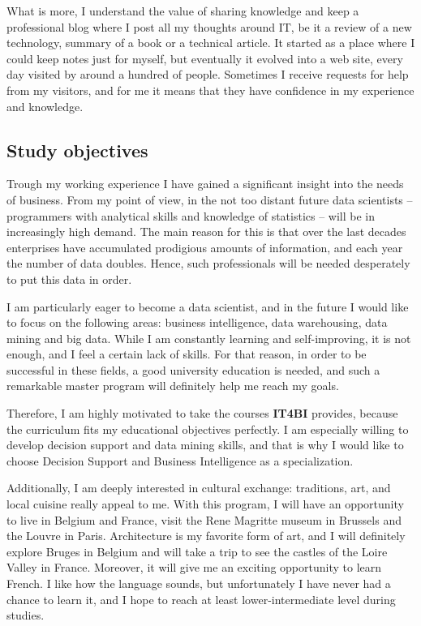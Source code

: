 \documentclass[a4paper,12pt]{article}
\begin{document}
What is more, I understand the value of sharing knowledge and keep a professional blog where I post all my thoughts around IT, be it a review of a new technology, summary of a book or a technical article. It started as a place where I could keep notes just for myself, but eventually it evolved into a web site, every day visited by around a hundred of people. Sometimes I receive requests for help from my visitors, and for me it means that they have confidence in my experience and knowledge.

\subsection*{Study objectives}

Trough my working experience I have gained a significant insight into the needs of business. From my point of view, in the not too distant future data scientists -- programmers with analytical skills and knowledge of statistics -- will be in increasingly high demand. The main reason for this is that over the last decades enterprises have accumulated prodigious amounts of information, and each year the number of data doubles. Hence, such professionals will be needed desperately to put this data in order.

I am particularly eager to become a data scientist, and in the future I would like to focus on the following areas: business intelligence, data warehousing, data mining and big data. While I am constantly learning and self-improving, it is not enough, and I feel a certain lack of skills. For that reason, in order to be successful in these fields, a good university education is needed, and such a remarkable master program will definitely help me reach my goals.

Therefore, I am highly motivated to take the courses \textbf{IT4BI} provides, because the curriculum fits my educational objectives perfectly. I am especially willing to develop decision support and data mining skills, and that is why I would like to choose Decision Support and Business Intelligence as a specialization.

Additionally, I am deeply interested in cultural exchange: traditions, art, and local cuisine really appeal to me. With this program, I will have an opportunity to live in Belgium and France, visit the Rene Magritte museum in Brussels and the Louvre in Paris. Architecture is my favorite form of art, and I will definitely explore Bruges in Belgium and will take a trip to see the castles of the Loire Valley in France. Moreover, it will give me an exciting opportunity to learn French. I like how the language sounds, but unfortunately I have never had a chance to learn it, and I hope to reach at least lower-intermediate level during studies.
\end{document}
